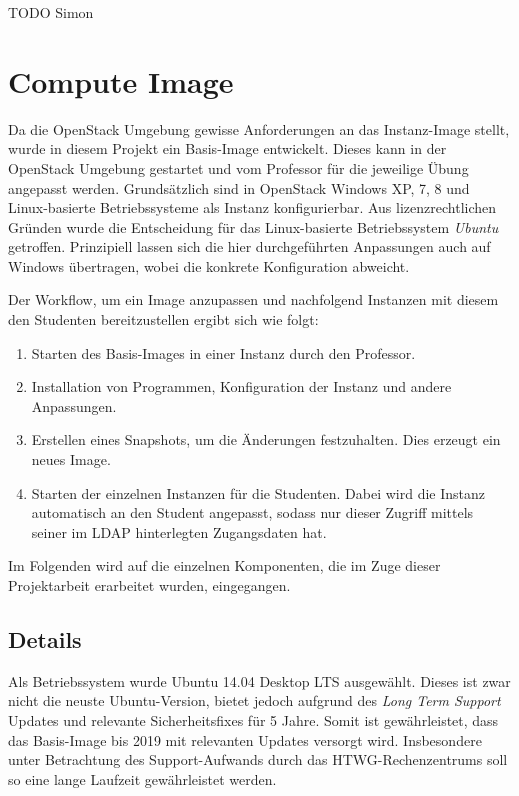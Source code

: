TODO Simon


\section{Compute Image}

Da die OpenStack Umgebung gewisse Anforderungen an das Instanz-Image stellt, wurde in diesem Projekt ein Basis-Image entwickelt. 
Dieses kann in der OpenStack Umgebung gestartet und vom Professor für die jeweilige Übung angepasst werden.
Grundsätzlich sind in OpenStack Windows XP, 7, 8 und Linux-basierte Betriebssysteme als Instanz konfigurierbar. 
Aus lizenzrechtlichen Gründen wurde die Entscheidung für das Linux-basierte Betriebssystem \emph{Ubuntu} getroffen. 
Prinzipiell lassen sich die hier durchgeführten Anpassungen auch auf Windows übertragen, wobei die konkrete Konfiguration abweicht.

Der Workflow, um ein Image anzupassen und nachfolgend Instanzen mit diesem den Studenten bereitzustellen ergibt sich wie folgt:

\begin{enumerate}
\item Starten des Basis-Images in einer Instanz durch den Professor.
\item Installation von Programmen, Konfiguration der Instanz und andere Anpassungen.
\item Erstellen eines Snapshots, um die Änderungen festzuhalten. Dies erzeugt ein neues Image.
\item Starten der einzelnen Instanzen für die Studenten. Dabei wird die Instanz automatisch an den Student angepasst, sodass nur dieser Zugriff mittels seiner im LDAP hinterlegten Zugangsdaten hat.
\end{enumerate}

Im Folgenden wird auf die einzelnen Komponenten, die im Zuge dieser Projektarbeit erarbeitet wurden, eingegangen. 

\subsection{Details}

Als Betriebssystem wurde Ubuntu 14.04 Desktop LTS ausgewählt. 
Dieses ist zwar nicht die neuste Ubuntu-Version, bietet jedoch aufgrund des \emph{Long Term Support} Updates und relevante Sicherheitsfixes für 5 Jahre. 
Somit ist gewährleistet, dass das Basis-Image bis 2019 mit relevanten Updates versorgt wird. 
Insbesondere unter Betrachtung des Support-Aufwands durch das HTWG-Rechenzentrums soll so eine lange Laufzeit gewährleistet werden.

